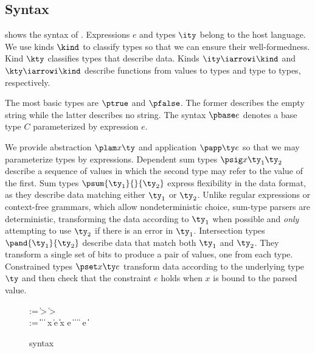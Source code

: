 \subsection{\ddca{} Syntax}
\label{sec:ddc-syntax}

 shows the syntax of \ddc{}. Expressions $e$
and types $\ity$ belong to the host language.  
We use kinds $\kind$ to classify types so that we can ensure their
well-formedness. Kind $\kty$ classifies types that describe data.
Kinds $\ity \iarrowi \kind$ and $\kty \iarrowi \kind$ describe
functions from values to types and type to types, respectively.

The most basic types are $\ptrue$ and $\pfalse$. The former describes
the empty string while the latter describes no string.
The syntax $\pbase e$ denotes a base type $C$ parameterized by 
expression $e$.

We provide abstraction $\plam x {} \ty$ and application
$\papp \ty e$ so that we may parameterize types by expressions.
Dependent sum types $\psig x {\ty_1} {\ty_2}$ describe a sequence
of values in which the second type may refer to the value of the first.
Sum types $\psum {\ty_1} {} {\ty_2}$
express flexibility in the data format, as they describe
data matching either $\ty_1$ or $\ty_2$. Unlike regular expressions or
context-free grammars, which allow nondeterministic choice,
sum-type parsers
are deterministic, transforming the data according to $\ty_1$
when possible and {\it only} attempting to
use $\ty_2$ if there is an error in $\ty_1$. Intersection types
$\pand {\ty_1} {\ty_2}$ describe data that match both $\ty_1$ and
$\ty_2$. They transform a single set of bits to produce
a pair of values, one from each type. Constrained types $\pset x \ty e$
transform data according to the underlying type $\ty$ and
then check that the constraint $e$ holds when $x$ is bound to the parsed value.


\begin{figure}
\begin{bnf}
   \meta{\gk} \::= \kty \| \ity \-> \gk 
                               \| \kty \-> \gk \\
   \meta{\ty} \::= 
    \ptrue\| \pfalse \|  \| 
    \plam{\var}{\ity}{\ty} \|  \nlalt
    \psig x \ty \ty \| \psum \ty e \ty \| \pand \ty \ty \|
    \pset x \ty e \| \pseq \ty {} \nlalt
    \ptyvar       \| \pmu{\ptyvar}{\gk}{\ty} \| \ptylam{\ptyvar}{\kty}{\ty} \| \ptyapp{\ty}{\ty}
    \nlalt \pcompute e \ity \| \pabsorb \ty \| \pscan{\ty}  
\end{bnf}
\caption{\ddc{} syntax}
\label{fig:ddca-syntax}
\end{figure}

